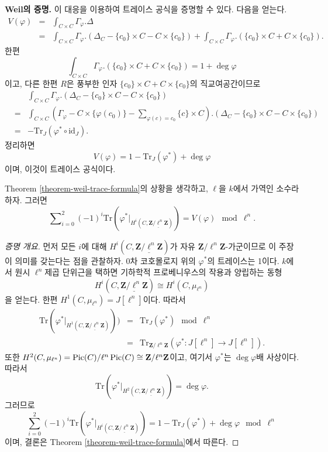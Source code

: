 \medskip\noindent
{\bf Weil의 증명.} 이 대응을 이용하여 트레이스 공식을 증명할 수
있다. 다음을 얻는다.
\begin{eqnarray*}
V(\varphi) & = & \int_{C \times C} \Gamma_\varphi.\Delta \\
& = & \int_{C \times C} \Gamma_\varphi. \left(\Delta_C - \{c_0\} \times C - C
\times \{c_0\}\right) + \int_{C \times C} \Gamma_\varphi. \left(\{c_0\} \times C
+ C \times \{c_0\}\right).
\end{eqnarray*}
한편
$$
\int_{C \times C} \Gamma_\varphi. \left(\{c_0\} \times C + C \times
\{c_0\}\right)
=
1 + \deg \varphi
$$
이고, 다른 한편 $R$은 풍부한 인자
$\{c_0\} \times C + C \times \{c_0\}$의 직교여공간이므로
\begin{eqnarray*}
& &
\int_{C \times C} \Gamma_\varphi. \left(\Delta_C - \{c_0\} \times C - C \times
\{c_0\}\right) \\
& = &
\int_{C \times C} \left(\Gamma_\varphi - C \times \{\varphi(c_0)\} -
\sum_{\varphi(c) = c_0} \{c\} \times C \right). \left(\Delta_C - \{c_0\} \times
C - C \times \{c_0\}\right) \\
& = & - \text{Tr}_J (\varphi^* \circ \text{id}_J).
\end{eqnarray*}
정리하면
$$
V(\varphi) = 1 - \text{Tr}_J (\varphi^*) + \deg \varphi
$$
이며, 이것이 트레이스 공식이다.

\begin{lemma}
\label{lemma-weil-mod}
Theorem \ref{theorem-weil-trace-formula}의 상황을 생각하고,
$\ell$을 $k$에서 가역인 소수라 하자. 그러면
$$
\sum\nolimits_{i = 0}^2
(-1)^i
\text{Tr}(\varphi^* |_{H^i (C, \underline{\mathbf{Z}/\ell^n \mathbf{Z}})})
=
V(\varphi) \mod \ell^n.
$$
\end{lemma}

\begin{proof}[증명 개요]
먼저 모든 $i$에 대해
$H^i(C, \underline{\mathbf{Z}/\ell^n \mathbf{Z}})$가 자유
$\mathbf{Z}/\ell^n \mathbf{Z}$-가군이므로 이 주장이 의미를 갖는다는
점을 관찰하자. 0차 코호몰로지 위의 $\varphi^*$의 트레이스는
1이다. $k$에서 원시 $\ell^n$제곱 단위근을 택하면 기하학적
프로베니우스의 작용과 양립하는 동형
$$
H^i(C, \underline{\mathbf{Z}/\ell^n \mathbf{Z}}) \cong H^i(C, \mu_{\ell^n})
$$
을 얻는다. 한편 $H^1(C, \mu_{\ell^n}) = J[\ell^n]$이다. 따라서
\begin{eqnarray*}
\text{Tr}(\varphi^* |_{H^1 (C, \underline{\mathbf{Z}/\ell^n \mathbf{Z}})})) & =
& \text{Tr}_J (\varphi^*) \mod \ell^n \\
& = & \text{Tr}_{\mathbf{Z}/\ell^n \mathbf{Z}} (\varphi^* : J[\ell^n] \to
J[\ell^n]).
\end{eqnarray*}
또한 $H^2(C, \mu_{\ell^n}) = \mathop{\mathrm{Pic}}\nolimits(C)/\ell^n\mathop{\mathrm{Pic}}\nolimits(C) \cong
\mathbf{Z}/\ell^n \mathbf{Z}$이고, 여기서 $\varphi^*$는
$\deg \varphi$배 사상이다. 따라서
$$
\text{Tr} (\varphi^*|_{H^2 (C, \underline{\mathbf{Z}/\ell^n \mathbf{Z}})}) =
\deg \varphi.
$$
그러므로
$$
\sum_{i = 0}^2 (-1)^i
\text{Tr}(\varphi^* |_{H^i (C, \underline{\mathbf{Z}/\ell^n \mathbf{Z}})}) =
1 - \text{Tr}_J(\varphi^*) + \deg \varphi \mod \ell^n
$$
이며, 결론은 Theorem \ref{theorem-weil-trace-formula}에서 따른다.
\end{proof}

